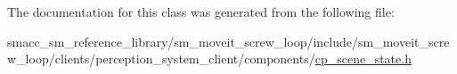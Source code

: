 The documentation for this class was generated from the following file\+:\begin{DoxyCompactItemize}
\item 
smacc\+\_\+sm\+\_\+reference\+\_\+library/sm\+\_\+moveit\+\_\+screw\+\_\+loop/include/sm\+\_\+moveit\+\_\+screw\+\_\+loop/clients/perception\+\_\+system\+\_\+client/components/\hyperlink{sm__moveit__screw__loop_2include_2sm__moveit__screw__loop_2clients_2perception__system__client_2components_2cp__scene__state_8h}{cp\+\_\+scene\+\_\+state.\+h}\end{DoxyCompactItemize}
